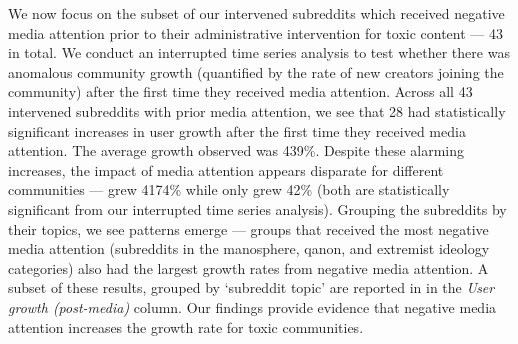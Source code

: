 % 
% 
% 

 We now focus on the subset of our intervened
subreddits which received negative media attention prior to their
administrative intervention for toxic content --- 43 in total. We conduct an
interrupted time series analysis to test whether there was anomalous community
growth (quantified by the rate of new creators joining the community) after the
first time they received media attention. Across all 43 intervened  subreddits
with prior media attention, we see that 28 had statistically significant
increases in user growth after the first time they received media attention.
The average growth observed was 439\%. Despite these alarming increases, the
impact of media attention appears disparate for different communities --- \eg
{} grew 4174\% while  only grew
42\% (both are statistically significant from our interrupted time series
analysis). Grouping the subreddits by their topics, we see patterns emerge ---
groups that received the most negative media  attention (subreddits in the
manosphere, qanon, and extremist ideology categories) also had the largest
growth rates from negative media attention. A subset of these results, grouped
by `subreddit topic' are reported in  in the
\emph{User growth (post-media)} column. Our findings provide
evidence that negative media attention increases the growth rate for toxic
communities. 


